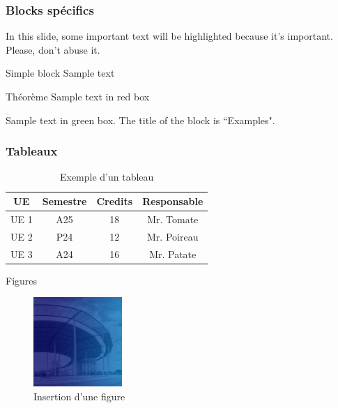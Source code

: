 \begin{frame}
    \frametitle{Blocks spécifics}
    
    In this slide, some important text will be
    \alert{highlighted} because it's important.
    Please, don't abuse it.
    
    \begin{block}{Simple block}
    Sample text
    \end{block}
    
    \begin{theorem}{Théorème}
    Sample text in red box
    \end{theorem}
    
    \begin{examples}
    Sample text in green box. The title of the block is ``Examples".
    \end{examples}
\end{frame}

\begin{frame}
    \frametitle{Tableaux}
    
    \begin{table}[]
        \centering
        \begin{tabular}{|c|c|c|c|}
            \hline
            UE & Semestre & Credits & Responsable  \\
            \hline
             UE 1 & A25 & 18   &  Mr. Tomate  \\
             UE 2 & P24 & 12   &  Mr. Poireau  \\
             UE 3 & A24 & 16   &  Mr. Patate  \\
             \hline
        \end{tabular}
        \caption{Exemple d'un tableau}
        \label{tab:surrogates}
    \end{table}
\end{frame}

\begin{frame}{Figures}
    \begin{figure}
        \centering
        \includegraphics[width=0.3\textwidth]{assets/imgs/img_utt.png}
        \caption{Insertion d'une figure}
    \end{figure}  
\end{frame}